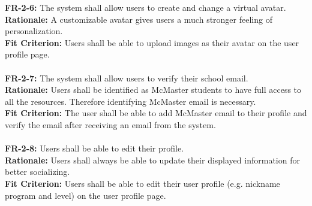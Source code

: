 \documentclass[12pt]{article}
\begin{document}
     \textbf{FR-2-6:} The system shall allow users to create and change a virtual avatar.\\
    \textbf{Rationale:} A customizable avatar gives users a much stronger feeling of personalization. \\
    \textbf{Fit Criterion:} Users shall be able to upload images as their avatar on the user profile page.\\\\
    \textbf{FR-2-7:} The system shall allow users to verify their school email.\\
    \textbf{Rationale:} Users shall be identified as McMaster students to have full access to all the resources. Therefore identifying McMaster email is necessary. \\
    \textbf{Fit Criterion:} The user shall be able to add McMaster email to their profile and verify the email after receiving an email from the system.\\\\
    \textbf{FR-2-8:} Users shall be able to edit their profile.\\
    \textbf{Rationale:} Users shall always be able to update their displayed information for better socializing.\\
    \textbf{Fit Criterion:} Users shall be able to edit their user profile (e.g. nickname program and level) on the user profile page.\\\\
\end{document}
